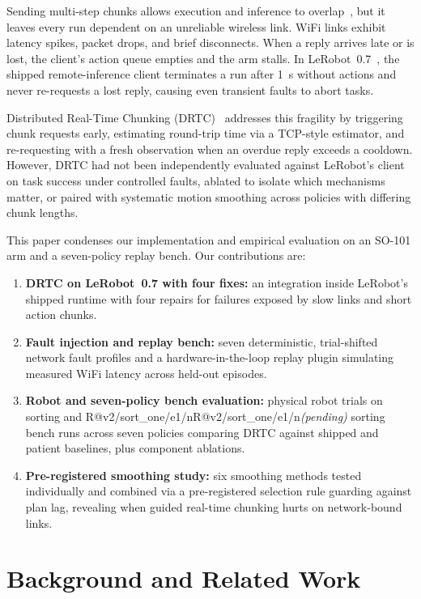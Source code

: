 \documentclass[conference]{IEEEtran}
\makeatletter
\newcommand{\R}[1]{\ifcsname R@#1\endcsname\csname R@#1\endcsname\else\textit{(pending)}\fi}
\newcommand{\drtc}{DRTC}
\makeatother
\begin{document}
Sending multi-step chunks allows execution and inference to overlap~\cite{shukor2025smolvla}, but it leaves every run dependent on an unreliable wireless link. WiFi links exhibit latency spikes, packet drops, and brief disconnects. When a reply arrives late or is lost, the client's action queue empties and the arm stalls. In LeRobot~0.7~\cite{lerobot}, the shipped remote-inference client terminates a run after 1~s without actions and never re-requests a lost reply, causing even transient faults to abort tasks.

Distributed Real-Time Chunking (\drtc)~\cite{vial2026drtc} addresses this fragility by triggering chunk requests early, estimating round-trip time via a TCP-style estimator, and re-requesting with a fresh observation when an overdue reply exceeds a cooldown. However, \drtc{} had not been independently evaluated against LeRobot's client on task success under controlled faults, ablated to isolate which mechanisms matter, or paired with systematic motion smoothing across policies with differing chunk lengths.

This paper condenses our implementation and empirical evaluation on an SO-101 arm and a seven-policy replay bench. Our contributions are:
\begin{enumerate}
  \item \textbf{\drtc{} on LeRobot~0.7 with four fixes:} an integration inside LeRobot's shipped runtime with four repairs for failures exposed by slow links and short action chunks.
  \item \textbf{Fault injection and replay bench:} seven deterministic, trial-shifted network fault profiles and a hardware-in-the-loop replay plugin simulating measured WiFi latency across held-out episodes.
  \item \textbf{Robot and seven-policy bench evaluation:} physical robot trials on sorting and \R{v2/sort_one/e1/n} sorting bench runs across seven policies comparing \drtc{} against shipped and patient baselines, plus component ablations.
  \item \textbf{Pre-registered smoothing study:} six smoothing methods tested individually and combined via a pre-registered selection rule guarding against plan lag, revealing when guided real-time chunking hurts on network-bound links.
\end{enumerate}

\section{Background and Related Work}
\end{document}
